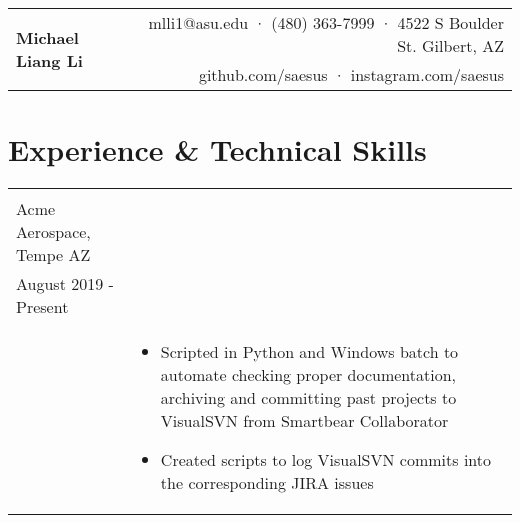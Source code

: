 \documentclass[10pt]{article}
\makeatletter
\newcommand{\headingtitle}[3]{
\begin{tabular*}{7in}{l@{\extracolsep{\fill}}r}
	\multirow{2}{*}{#1}&#2\\
	&#3\\
\end{tabular*}}
\newcommand{\tabu}[2]{
	\begin{tabular}[t]{ l l }
		#1 & #2
	\end{tabular}}
\makeatother
\begin{document}
	
	\headingtitle{\textbf{\huge Michael Liang Li}}{mlli1@asu.edu · (480) 363-7999 · 4522 S Boulder St. Gilbert, AZ}{github.com/saesus · instagram.com/saesus}
	\vspace{-2em}
	
	\section{Experience \& Technical Skills}
		\tabu
		{\begin{minipage}[t]{0.3\linewidth}
				\textbf{Software Intern} \\
				Acme Aerospace, Tempe AZ\\
				August 2019 - Present\\
		\end{minipage}}
		{\begin{minipage}[t]{.7\linewidth}
				\begin{itemize}[noitemsep, topsep=0pt]
					\item Scripted in Python and Windows batch to automate checking proper documentation, archiving and committing past projects to VisualSVN from Smartbear Collaborator
					\item Created scripts to log VisualSVN commits into the corresponding JIRA issues
				\end{itemize}
		\end{minipage}}
	
\end{document}
